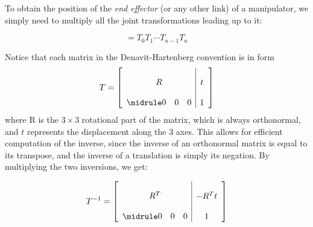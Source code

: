 To obtain the position of the \textit{end effector} (or any other link) of a manipulator, we simply need to multiply all the joint transformations leading up to it:

\begin{equation}
  [T] = T_0T_1\cdots T_{n-1}T_n
\end{equation}

Notice that each matrix in the Denavit-Hartenberg convention is in form
\[
    T = \begin{bmatrix}
        \begin{array}{c|c}
           \begin{matrix}
              & & & \\
              & & R & & \\
              & & &
           \end{matrix}
            & t \\
        \midrule
        \begin{matrix}
              0 & 0 & 0 \\
           \end{matrix}
            & 1 \\
        \end{array}
    \end{bmatrix}
\]
\noindent where R is the $3\times3$ rotational part of the matrix, which is always orthonormal, and $t$ represents the displacement along the 3 axes. This allows for efficient computation of the inverse, since the inverse of an orthonormal matrix is equal to its transpose, and the inverse of a translation is simply its negation. By multiplying the two inversions, we get:

\[
    T^{-1} = \begin{bmatrix}
        \begin{array}{c|c}
           \begin{matrix}
              & & & \\
              & & R^T & & \\
              & & &
           \end{matrix}
            & -R^{T}t \\
        \midrule
        \begin{matrix}
              0 & 0 & 0 \\
           \end{matrix}
            & 1 \\
        \end{array}
    \end{bmatrix}
\]

